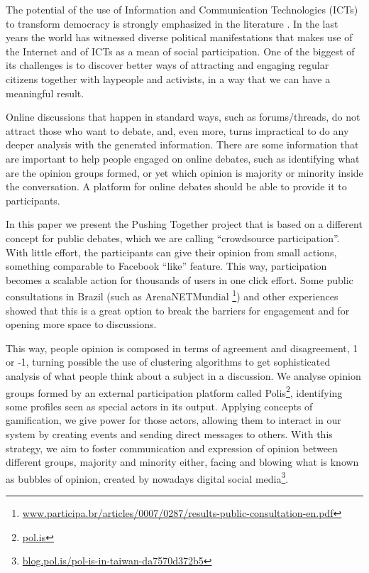 \documentclass{llncs}
\begin{document}
  The potential of the use of Information and Communication Technologies (ICTs)
to transform democracy is strongly emphasized in the literature
\cite{benkler} \cite{castells} \cite{levy}. In the last years the world has
witnessed diverse political manifestations that makes use of the Internet 
and of ICTs as a mean of social participation.
One of the biggest of its challenges is to discover better ways of attracting
and engaging regular citizens together with laypeople and activists, in a way
that we can have a meaningful result.

  Online discussions that happen in standard ways, such as forums/threads, do
not attract those who want to debate, and, even more, turns
impractical to do any deeper analysis with the generated information. There are
some information that are important to help people engaged on online debates,
such as identifying what are the opinion groups formed, or yet which opinion is
majority or minority inside the conversation. A platform for online debates should
be able to provide it to participants.

  In this paper we present the Pushing Together project that is based on a
different concept for public debates, which we are calling ``crowdsource
participation''. With little effort, the participants can give their
opinion from small actions, something comparable to Facebook ``like'' feature.
This way, participation becomes a scalable action for thousands of users in
one click effort. Some public consultations in Brazil (such as ArenaNETMundial
\footnote{\url{www.participa.br/articles/0007/0287/results-public-consultation-en.pdf}})
and other experiences showed that this is a great option to break
the barriers for engagement and for opening more space to discussions.

  This way, people opinion is composed in terms of agreement and disagreement,
1 or -1, turning possible the use of clustering algorithms to get sophisticated analysis of what
people think about a subject in a discussion. We analyse opinion groups formed by
an external participation platform called Polis\footnote{\url{pol.is}},
identifying some profiles seen as special actors in its output.
Applying concepts of gamification, we give power for those
actors, allowing them to interact in our system by creating events and
sending direct messages to others. With this strategy, we aim to foster
communication and expression of opinion between different groups, majority and
minority either, facing and blowing what is known as
bubbles of opinion, created by nowadays digital
social media\footnote{\url{blog.pol.is/pol-is-in-taiwan-da7570d372b5}}.
\end{document}
